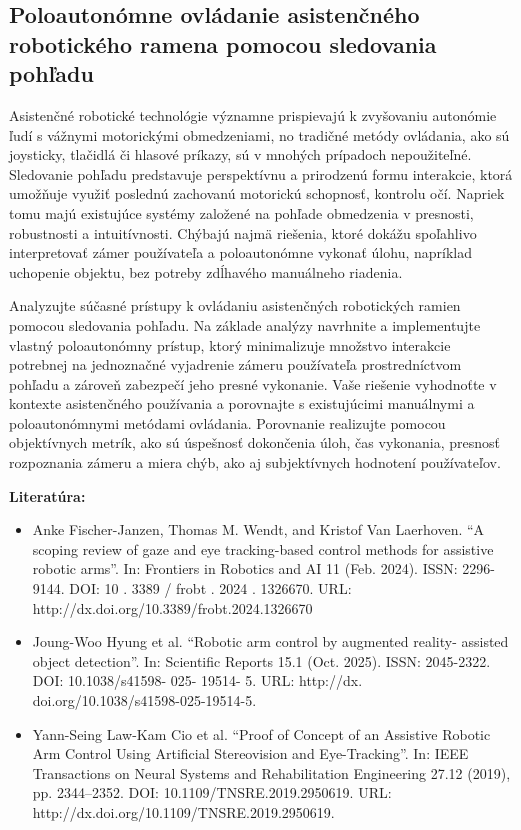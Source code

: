 \documentclass[11pt,english,a4paper]{article}
\begin{document}
\subsection{Poloautonómne  ovládanie  asistenčného  robotického  ramena  pomocou  sledovania  pohľadu}

Asistenčné  robotické  technológie  významne  prispievajú  k  zvyšovaniu  autonómie  ľudí  s  vážnymi  motorickými  obmedzeniami,  no  tradičné  metódy  ovládania,  ako  sú  joysticky,  tlačidlá  či  hlasové  príkazy,  sú  v  mnohých  prípadoch  nepoužiteľné.  Sledovanie  pohľadu  predstavuje  perspektívnu  a  prirodzenú  formu  interakcie,  ktorá  umožňuje  využiť  poslednú  zachovanú  motorickú  schopnosť,  kontrolu  očí.  Napriek  tomu  majú  existujúce  systémy  založené  na  pohľade  obmedzenia  v  presnosti,  robustnosti  a  intuitívnosti.  Chýbajú  najmä  riešenia,  ktoré  dokážu  spoľahlivo  interpretovať  zámer  používateľa  a  poloautonómne  vykonať  úlohu,  napríklad  uchopenie  objektu,  bez  potreby  zdĺhavého  manuálneho  riadenia.

Analyzujte  súčasné  prístupy  k  ovládaniu  asistenčných  robotických  ramien  pomocou  sledovania  pohľadu.  Na  základe  analýzy  navrhnite  a  implementujte  vlastný  poloautonómny  prístup,  ktorý  minimalizuje  množstvo  interakcie  potrebnej  na  jednoznačné  vyjadrenie  zámeru  používateľa  prostredníctvom  pohľadu  a  zároveň  zabezpečí  jeho  presné  vykonanie.  Vaše  riešenie  vyhodnoťte  v  kontexte  asistenčného  používania  a  porovnajte  s  existujúcimi  manuálnymi  a  poloautonómnymi  metódami  ovládania.  Porovnanie  realizujte  pomocou  objektívnych  metrík,  ako  sú  úspešnosť  dokončenia  úloh,  čas  vykonania,  presnosť  rozpoznania  zámeru  a  miera  chýb,  ako  aj  subjektívnych  hodnotení  používateľov.

\textbf{Literatúra:  }
\begin{itemize}
        \item  Anke  Fischer-Janzen,  Thomas  M.  Wendt,  and  Kristof  Van  Laerhoven.
“A  scoping  review  of  gaze  and  eye  tracking-based  control  methods
for  assistive  robotic  arms”.  In:  Frontiers  in  Robotics  and  AI  11  (Feb.
2024).  ISSN:  2296-9144.  DOI:  10  .  3389  /  frobt  .  2024  .  1326670.  URL:
http://dx.doi.org/10.3389/frobt.2024.1326670
        \item  Joung-Woo  Hyung  et  al.  “Robotic  arm  control  by  augmented  reality-
assisted  object  detection”.  In:  Scientific  Reports  15.1  (Oct.  2025).  ISSN:
2045-2322.  DOI:  10.1038/s41598-  025-  19514-  5.  URL:  http://dx.
doi.org/10.1038/s41598-025-19514-5.
        \item  Yann-Seing  Law-Kam  Cio  et  al.  “Proof  of  Concept  of  an  Assistive
Robotic  Arm  Control  Using  Artificial  Stereovision  and  Eye-Tracking”.
In:  IEEE  Transactions  on  Neural  Systems  and  Rehabilitation  Engineering
27.12  (2019),  pp.  2344–2352.  DOI:  10.1109/TNSRE.2019.2950619.  URL:
http://dx.doi.org/10.1109/TNSRE.2019.2950619.
\end{itemize}
\end{document}
